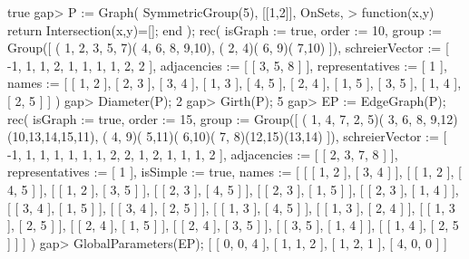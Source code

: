 true
gap> P := Graph( SymmetricGroup(5), [[1,2]], OnSets,
>             function(x,y) return Intersection(x,y)=[]; end );
rec( isGraph := true, order := 10, 
  group := Group([ ( 1, 2, 3, 5, 7)( 4, 6, 8, 9,10), ( 2, 4)( 6, 9)( 7,10) ]),
  schreierVector := [ -1, 1, 1, 2, 1, 1, 1, 1, 2, 2 ], 
  adjacencies := [ [ 3, 5, 8 ] ], representatives := [ 1 ], 
  names := [ [ 1, 2 ], [ 2, 3 ], [ 3, 4 ], [ 1, 3 ], [ 4, 5 ], [ 2, 4 ], 
      [ 1, 5 ], [ 3, 5 ], [ 1, 4 ], [ 2, 5 ] ] )
gap> Diameter(P);
2
gap> Girth(P);
5
gap> EP := EdgeGraph(P);
rec( isGraph := true, order := 15, 
  group := Group([ ( 1, 4, 7, 2, 5)( 3, 6, 8, 9,12)(10,13,14,15,11), 
      ( 4, 9)( 5,11)( 6,10)( 7, 8)(12,15)(13,14) ]), 
  schreierVector := [ -1, 1, 1, 1, 1, 1, 1, 2, 2, 1, 2, 1, 1, 1, 2 ], 
  adjacencies := [ [ 2, 3, 7, 8 ] ], representatives := [ 1 ], 
  isSimple := true, 
  names := [ [ [ 1, 2 ], [ 3, 4 ] ], [ [ 1, 2 ], [ 4, 5 ] ], 
      [ [ 1, 2 ], [ 3, 5 ] ], [ [ 2, 3 ], [ 4, 5 ] ], [ [ 2, 3 ], [ 1, 5 ] ], 
      [ [ 2, 3 ], [ 1, 4 ] ], [ [ 3, 4 ], [ 1, 5 ] ], [ [ 3, 4 ], [ 2, 5 ] ], 
      [ [ 1, 3 ], [ 4, 5 ] ], [ [ 1, 3 ], [ 2, 4 ] ], [ [ 1, 3 ], [ 2, 5 ] ], 
      [ [ 2, 4 ], [ 1, 5 ] ], [ [ 2, 4 ], [ 3, 5 ] ], [ [ 3, 5 ], [ 1, 4 ] ], 
      [ [ 1, 4 ], [ 2, 5 ] ] ] )
gap> GlobalParameters(EP);
[ [ 0, 0, 4 ], [ 1, 1, 2 ], [ 1, 2, 1 ], [ 4, 0, 0 ] ]
\endexample
